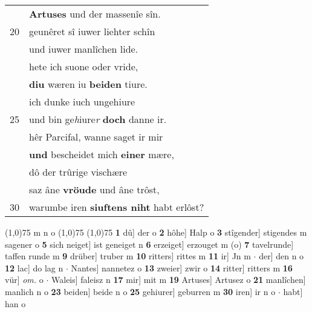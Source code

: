 \documentclass[8pt,a4paper,notitlepage]{article}
\begin{document}
\begin{table}[ht]
\begin{minipage}[t]{0.5\linewidth}
\begin{tabular}{rl}
 & \textbf{Artuses} und der massenîe sîn.\\ 
20 & geunêret sî iuwer liehter schîn\\ 
 & und iuwer manlîchen lide.\\ 
 & hete ich suone oder vride,\\ 
 & \textbf{diu} wæren iu \textbf{beiden} tiure.\\ 
 & ich dunke iuch ungehiure\\ 
25 & und bin ge\textit{h}iure\textit{r} \textbf{doch} danne ir.\\ 
 & hêr Parcifal, wanne saget ir mir\\ 
 & \textbf{und} bescheidet mich \textbf{einer} mære,\\ 
 & dô der trûrige vischære\\ 
 & saz âne \textbf{vröude} und âne trôst,\\ 
30 & warumbe iren \textbf{siuftens niht} habt erlôst?\\ 
\end{tabular}
\scriptsize
\line(1,0){75} \newline
m n o \newline
\line(1,0){75} \newline
\newline
\line(1,0){75} \newline
\textbf{1} dû] der o \textbf{2} hôhe] Halp o \textbf{3} stîgender] stigendes m sagener o \textbf{5} sich neiget] ist geneiget n \textbf{6} erzeiget] erzouget m (o) \textbf{7} tavelrunde] taffen runde m \textbf{9} drüber] truber m \textbf{10} ritters] rittes m \textbf{11} ir] Jn m  $\cdot$ der] den n o \textbf{12} lac] do lag n  $\cdot$ Nantes] nannetez o \textbf{13} zweier] zwir o \textbf{14} ritter] ritters m \textbf{16} vür] \textit{om.} o  $\cdot$ Waleis] faleisz n \textbf{17} mir] mit m \textbf{19} Artuses] Artusez o \textbf{21} manlîchen] manlich n o \textbf{23} beiden] beide n o \textbf{25} gehiurer] geburren m \textbf{30} iren] ir n o  $\cdot$ habt] han o \newline
\end{minipage}
\end{table}
\newpage
\end{document}

